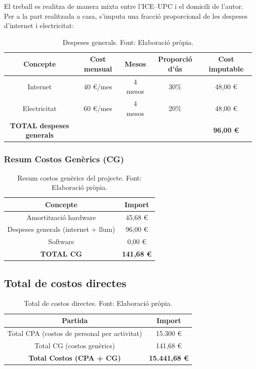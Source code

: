 \documentclass[12pt,a4paper,twoside]{report}
\begin{document}
El treball es realitza de manera mixta entre l'ICE--UPC i el domicili de l'autor. Per a la part realitzada a casa, s'imputa una fracci\'o proporcional de les despeses d'internet i electricitat:

\begin{table}[H]
\centering
\caption{Despeses generals. Font: Elaboraci\'o pr\`opia.}
\label{tab:despeses}
\begin{tabular}{@{}ccccc@{}}
\toprule
\textbf{Concepte} & \textbf{Cost mensual} & \textbf{Mesos} & \textbf{Proporci\'o d'\'us} & \textbf{Cost imputable} \\
\midrule
Internet & 40 \euro/mes & 4 mesos & 30\% & 48,00 \euro \\
Electricitat & 60 \euro/mes & 4 mesos & 20\% & 48,00 \euro \\
\midrule
\textbf{TOTAL despeses generals} & & & & \textbf{96,00 \euro} \\
\bottomrule
\end{tabular}
\end{table}

\subsubsection{Resum Costos Gen\`erics (CG)}

\begin{table}[H]
\centering
\caption{Resum costos gen\`erics del projecte. Font: Elaboraci\'o pr\`opia.}
\label{tab:resum-cg}
\begin{tabular}{@{}cc@{}}
\toprule
\textbf{Concepte} & \textbf{Import} \\
\midrule
Amortitzaci\'o hardware & 45,68 \euro \\
Despeses generals (internet + llum) & 96,00 \euro \\
Software & 0,00 \euro \\
\midrule
\textbf{TOTAL CG} & \textbf{141,68 \euro} \\
\bottomrule
\end{tabular}
\end{table}

\subsection{Total de costos directes}
\label{subsec:total-directes}

\begin{table}[H]
\centering
\caption{Total de costos directes. Font: Elaboraci\'o pr\`opia.}
\label{tab:total-directes}
\begin{tabular}{@{}cc@{}}
\toprule
\textbf{Partida} & \textbf{Import} \\
\midrule
Total CPA (costos de personal per activitat) & 15.300 \euro \\
Total CG (costos gen\`erics) & 141,68 \euro \\
\midrule
\textbf{Total Costos (CPA + CG)} & \textbf{15.441,68 \euro} \\
\bottomrule
\end{tabular}
\end{table}
\end{document}
